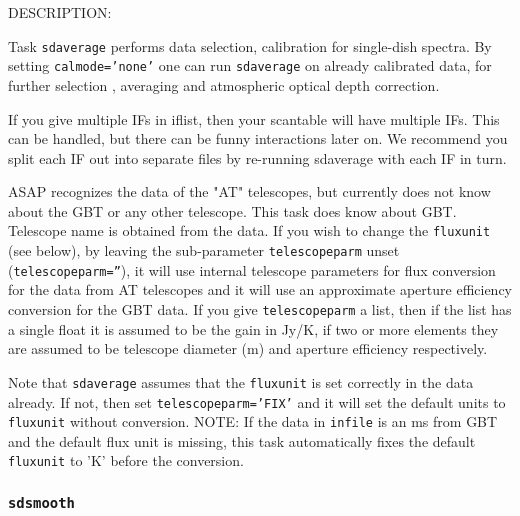   DESCRIPTION:

  Task {\tt sdaverage} performs data selection, calibration for single-dish
  spectra.  By setting {\tt calmode='none'}
  one can run {\tt sdaverage} on already calibrated data, for further selection
  , averaging and atmospheric optical depth correction.

  If you give multiple IFs in iflist, then your scantable will have
  multiple IFs.  This can be handled, but there can be funny interactions
  later on.  We recommend you split each IF out into separate files
  by re-running sdaverage with each IF in turn.

  ASAP recognizes the data of the "AT" telescopes, but currently
  does not know about the GBT or any other telescope. This task
  does know about GBT. Telescope name is obtained from the data.
  If you wish to change the {\tt fluxunit} (see below), by leaving
  the sub-parameter {\tt telescopeparm} unset ({\tt telescopeparm=''}),
  it will use internal telescope parameters for
  flux conversion for the data from AT telescopes and it will use an
  approximate aperture efficiency conversion for the GBT data.
  If you give {\tt telescopeparm} a list, then if the list has a single float it
  is assumed to be the gain in Jy/K, if two or more elements they are assumed
  to be telescope diameter (m) and aperture efficiency
  respectively.

  Note that {\tt sdaverage} assumes that the {\tt fluxunit} is set correctly in
  the data already.  If not, then set {\tt telescopeparm='FIX'} and it
  will set the default units to {\tt fluxunit} without conversion.
  NOTE: If the data in {\tt infile} is an ms from GBT and the default flux
  unit is missing, this task automatically fixes the default {\tt fluxunit}
  to 'K' before the conversion.

\subsubsection{{\tt sdsmooth}}
\label{section:sd.sdtasks.tasks.sdsmooth}

